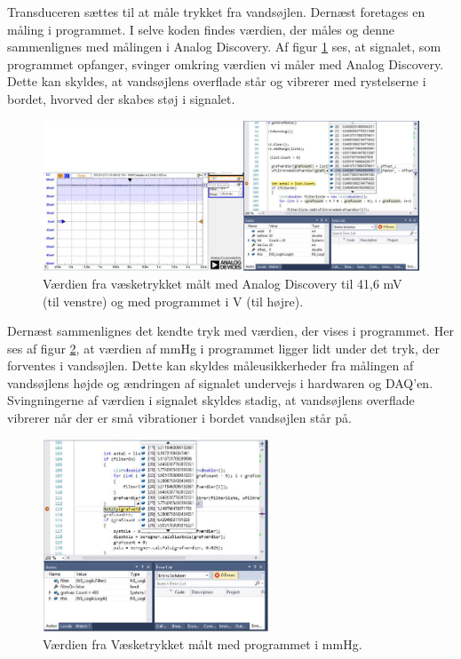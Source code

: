 Transduceren sættes til at måle trykket fra vandsøjlen. Dernæst foretages en måling i programmet. I selve koden findes værdien, der måles og denne sammenlignes med målingen i Analog Discovery. Af figur \ref{fig:Vaesketryk2} ses, at signalet, som programmet opfanger, svinger omkring værdien vi måler med Analog Discovery. Dette kan skyldes, at vandsøjlens overflade står og vibrerer med rystelserne i bordet, hvorved der skabes støj i signalet.

\begin{figure}[H]
	\centering
	\includegraphics[width=1.1\textwidth]{Figurer/Test/Vandsoejle}
	\caption{Værdien fra væsketrykket målt med Analog Discovery til 41,6 mV (til venstre) og med programmet i V (til højre).}
	\label{fig:Vaesketryk2}
\end{figure}

Dernæst sammenlignes det kendte tryk med værdien, der vises i programmet. Her ses af figur \ref{fig:mmHgtryk}, at værdien af mmHg i programmet ligger lidt under det tryk, der forventes i vandsøjlen. Dette kan skyldes måleusikkerheder fra målingen af vandsøjlens højde og ændringen af signalet undervejs i hardwaren og DAQ’en. Svingningerne af værdien i signalet skyldes stadig, at vandsøjlens overflade vibrerer når der er små vibrationer i bordet vandsøjlen står på.  

\begin{figure}[H]
	\centering
	\includegraphics[width=0.6\textwidth]{Figurer/Test/mmHg}
	\caption{Værdien fra Væsketrykket målt med programmet i mmHg.}
	\label{fig:mmHgtryk}
\end{figure}